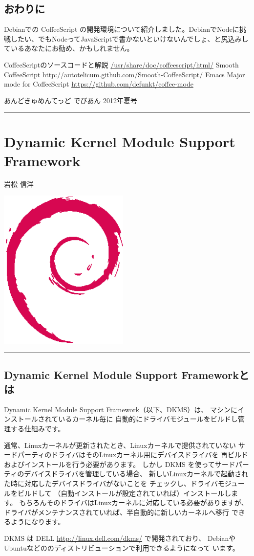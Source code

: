 \documentclass[mingoth,a4paper]{jsarticle}
\renewcommand{\dancersection}[2]{%
\newpage
あんどきゅめんてっど でびあん 2012年夏号
%
\vspace{0.1mm}\\
{\color{dancerdarkblue}\rule{\hsize}{2mm}}

%
%
\begin{minipage}[t]{0.6\hsize}
\color{dancerdarkblue}
\vspace{1cm}
\section{#1}
\hfill{}#2\\
\end{minipage}
\begin{minipage}[t]{0.4\hsize}
\vspace{-2cm}
\hfill{}\includegraphics[height=8cm]{image200502/openlogo-nd.eps}\\
\vspace{-5cm}
\end{minipage}
%
{\color{dancerlightblue}\rule{0.66\hsize}{2mm}}
%
\vspace{2cm}
}
\begin{document}
\subsection{おわりに}

Debianでの CoffeeScript の開発環境について紹介しました。DebianでNodeに挑
戦したい、でもNodeってJavaScriptで書かないといけないんでしょ、と尻込みし
ているあなたにお勧め、かもしれません。

\begin{thebibliography}{0}
 CoffeeScriptのソースコードと解説
	\url{/usr/share/doc/coffeescript/html/}
 Smooth CoffeeScript
	\url{http://autotelicum.github.com/Smooth-CoffeeScript/}
 Emacs Major mode for CoffeeScript
	\url{https://github.com/defunkt/coffee-mode}
\end{thebibliography}

\dancersection{Dynamic Kernel Module Support Framework}{岩松 信洋}

\subsection{Dynamic Kernel Module Support Frameworkとは}

Dynamic Kernel Module Support Framework（以下、DKMS）は、
マシンにインストールされているカーネル毎に
自動的にドライバモジュールをビルドし管理する仕組みです。

通常、Linuxカーネルが更新されたとき、Linuxカーネルで提供されていない
サードパーティのドライバはそのLinuxカーネル用にデバイスドライバを
再ビルドおよびインストールを行う必要があります。
しかし DKMS を使ってサードパーティのデバイスドライバを管理している場合、
新しいLinuxカーネルで起動された時に対応したデバイスドライバがないことを
チェックし、ドライバモジュールをビルドして
（自動インストールが設定されていれば）インストールします。
もちろんそのドライバはLinuxカーネルに対応している必要がありますが、
ドライバがメンテナンスされていれば、半自動的に新しいカーネルへ移行
できるようになります。



DKMS は DELL \url{http://linux.dell.com/dkms/} で開発されており、
DebianやUbuntuなどののディストリビューションで利用できるようになって
います。
\end{document}
